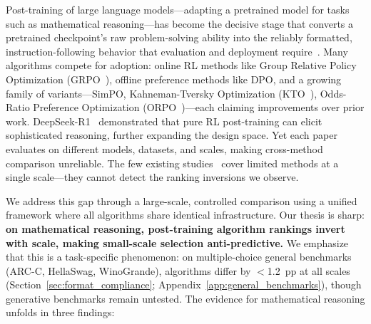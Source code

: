 \documentclass{article}
\begin{document}
Post-training of large language models---adapting a pretrained model for tasks such as mathematical reasoning---has become the decisive stage that converts a pretrained checkpoint's raw problem-solving ability into the reliably formatted, instruction-following behavior that evaluation and deployment require~\citep{ouyang2022training, touvron2023llama2}. Many algorithms compete for adoption: online RL methods like Group Relative Policy Optimization (GRPO~\citep{shao2024deepseekmath}), offline preference methods like DPO, and a growing family of variants---SimPO, Kahneman-Tversky Optimization (KTO~\citep{ethayarajh2024kto}), Odds-Ratio Preference Optimization (ORPO~\citep{hong2024orpo})---each claiming improvements over prior work. DeepSeek-R1~\citep{deepseek2025r1} demonstrated that pure RL post-training can elicit sophisticated reasoning, further expanding the design space. Yet each paper evaluates on different models, datasets, and scales, making cross-method comparison unreliable. The few existing studies~\citep{xu2024dpo, spangher2025rlhf} cover limited methods at a single scale---they cannot detect the ranking inversions we observe.

We address this gap through a large-scale, controlled comparison using a unified framework where all algorithms share identical infrastructure. Our thesis is sharp: \textbf{on mathematical reasoning, post-training algorithm rankings invert with scale, making small-scale selection anti-predictive.} We emphasize that this is a task-specific phenomenon: on multiple-choice general benchmarks (ARC-C, HellaSwag, WinoGrande), algorithms differ by $<$1.2~pp at all scales (Section~\ref{sec:format_compliance}; Appendix~\ref{app:general_benchmarks}), though generative benchmarks remain untested. The evidence for mathematical reasoning unfolds in three findings:
\end{document}
